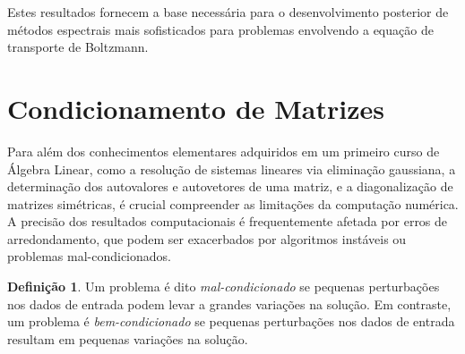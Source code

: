 \documentclass{article}
\theoremstyle{plain}
\theoremstyle{definition}
\newtheorem{defn}{Definição}[section]
\theoremstyle{remark}
\begin{document}
Estes resultados fornecem a base necessária para o desenvolvimento posterior de métodos espectrais mais sofisticados para problemas envolvendo a equação de transporte de Boltzmann.

\newpage

\section{Condicionamento de Matrizes}

Para além dos conhecimentos elementares adquiridos em um primeiro curso de Álgebra Linear, como a resolução de sistemas lineares via eliminação gaussiana, a determinação dos autovalores e autovetores de uma matriz, e a diagonalização de matrizes simétricas, é crucial compreender as limitações da computação numérica. A precisão dos resultados computacionais é frequentemente afetada por erros de arredondamento, que podem ser exacerbados por algoritmos instáveis ou problemas mal-condicionados.

\begin{defn}
  Um problema é dito \textit{mal-condicionado} se pequenas perturbações nos dados de entrada podem levar a grandes variações na solução. Em contraste, um problema é \textit{bem-condicionado} se pequenas perturbações nos dados de entrada resultam em pequenas variações na solução.
\end{defn}
\end{document}
